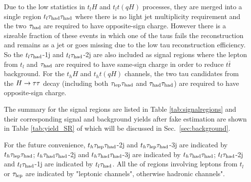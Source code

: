 Due to the low statistics in $t_lH$ and $t_lt(qH)$ processes, they are merged into a single region $t_l\tau_\text{had}{}\tau_\text{had}$ where there is no light jet multiplicity requirement and the two $\tau_\text{had}$ are required to have opposite-sign charge. However there is a sizeable fraction of these events in which one of the taus fails the reconstruction and remains as a jet or goes missing due to
the low tau reconstruction efficiency. So the $t_l\tau_\text{had}$-1j and $t_l\tau_\text{had}$-2j are also included as signal regions where the lepton from $t_l$ and $\tau_\text{had}$ are required to have same-sign
charge in order to reduce $t\bar t$ background. For the $t_hH$ and $t_ht(qH)$ channels, the two tau candidates from the $H \rightarrow \tau\tau$ decay (including both $\tau_\text{lep}{}\tau_\text{had}$ and $\tau_\text{had}{}\tau_\text{had}$) are required to have opposite-sign charge.  

The summary for the signal regions are listed in Table \ref{tab:signalregions} and their corresponding signal and background yields after fake estimation are shown
in Table \ref{tab:yield_SR} of which will be discussed in Sec.~\ref{sec:background}. 

For the future convenience, $t_h\tau_\text{lep}{}\tau_\text{had}$-2j and $t_h\tau_\text{lep}{}\tau_\text{had}$-3j are indicated by $t_h\tau_\text{lep}{}\tau_\text{had}$; $t_h\tau_\text{had}{}\tau_\text{had}$-2j and $t_h\tau_\text{had}{}\tau_\text{had}$-3j are indicated by $t_h\tau_\text{had}{}\tau_\text{had}$; $t_l\tau_\text{had}$-2j and $t_l\tau_\text{had}$-1j are indicated by $t_l\tau_\text{had}$. All the of regions involving leptons from $t_l$ or $\tau_\text{lep}$ are indicated by "leptonic channels", otherwise hadronic channels".

